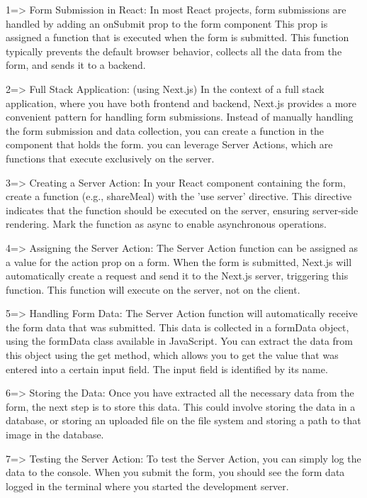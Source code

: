    1=> Form Submission in React:
        In most React projects, form submissions are handled by adding an onSubmit prop to the form component
        This prop is assigned a function that is executed when the form is submitted. 
        This function typically prevents the default browser behavior, collects all the data from the form, and sends it to a backend.

    2=> Full Stack Application: (using Next.js)
        In the context of a full stack application, where you have both frontend and backend,
        Next.js provides a more convenient pattern for handling form submissions. 
        Instead of manually handling the form submission and data collection, you can create a function in the component that holds the form.
        you can leverage Server Actions, which are functions that execute exclusively on the server.
    
    3=> Creating a Server Action:
        In your React component containing the form, create a function (e.g., shareMeal) with the 'use server' directive.
        This directive indicates that the function should be executed on the server, ensuring server-side rendering.
        Mark the function as async to enable asynchronous operations.

    4=> Assigning the Server Action: 
        The Server Action function can be assigned as a value for the action prop on a form. 
        When the form is submitted, Next.js will automatically create a request and send it to the Next.js server, triggering this function. 
        This function will execute on the server, not on the client.

    5=> Handling Form Data: 
        The Server Action function will automatically receive the form data that was submitted. 
        This data is collected in a formData object, using the formData class available in JavaScript. 
        You can extract the data from this object using the get method, which allows you to get the value that was entered into a certain input field. 
        The input field is identified by its name.

    6=> Storing the Data: 
        Once you have extracted all the necessary data from the form, the next step is to store this data. 
        This could involve storing the data in a database, or storing an uploaded file on the file system and storing a path to that image in the database.

    7=> Testing the Server Action: To test the Server Action, you can simply log the data to the console.
         When you submit the form, you should see the form data logged in the terminal where you started the development server.

